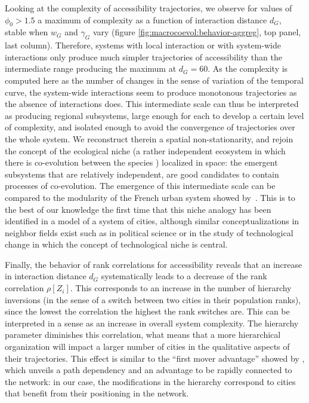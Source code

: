 \documentclass[11pt]{article}
\begin{document}
Looking at the complexity of accessibility trajectories, we observe for values of $\phi_0 > 1.5$ a maximum of complexity as a function of interaction distance $d_G$, stable when $w_G$ and $\gamma_G$ vary (figure \ref{fig:macrocoevol:behavior-aggreg}, top panel, last column). Therefore, systems with local interaction or with system-wide interactions only produce much simpler trajectories of accessibility than the intermediate range producing the maximum at $d_G=60$. As the complexity is computed here as the number of changes in the sense of variation of the temporal curve, the system-wide interactions seem to produce monotonous trajectories as the absence of interactions does. This intermediate scale can thus be interpreted as producing regional subsystems, large enough for each to develop a certain level of complexity, and isolated enough to avoid the convergence of trajectories over the whole system. We reconstruct therein a spatial non-stationarity, and rejoin the concept of the ecological niche (a rather independent ecosystem in which there is co-evolution between the species \citep{holland2012signals}) localized in space: the emergent subsystems that are relatively independent, are good candidates to contain processes of co-evolution. The emergence of this intermediate scale can be compared to the modularity of the French urban system showed by~\cite{berroir2017systemes}. This is to the best of our knowledge the first time that this niche analogy has been identified in a model of a system of cities, although similar conceptualizations in neighbor fields exist such as in political science \citep{monstadt2009conceptualizing} or in the study of technological change \citep{geels2005processes} in which the concept of technological niche is central.



Finally, the behavior of rank correlations for accessibility reveals that an increase in interaction distance $d_G$ systematically leads to a decrease of the rank correlation $\rho \left[Z_i \right]$. This corresponds to an increase in the number of hierarchy inversions (in the sense of a switch between two cities in their population ranks), since the lowest the correlation the highest the rank switches are. This can be interpreted in a sense as an increase in overall system complexity. The hierarchy parameter diminishes this correlation, what means that a more hierarchical organization will impact a larger number of cities in the qualitative aspects of their trajectories. This effect is similar to the ``first mover advantage'' showed by \cite{levinson2011does}, which unveils a path dependency and an advantage to be rapidly connected to the network: in our case, the modifications in the hierarchy correspond to cities that benefit from their positioning in the network.
\end{document}
